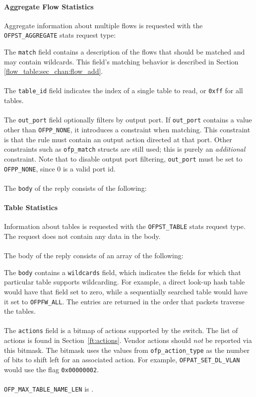 \paragraph{Aggregate Flow Statistics}
Aggregate information about multiple flows is requested with the \verb|OFPST_AGGREGATE| stats request type:


The \verb|match| field contains a description of the flows that should be matched and may contain wildcards.  This field's matching behavior is described in Section \ref{flow_table:sec_chan:flow_add}.
\\\\
The \verb|table_id| field indicates the index of a single table to read, or \verb|0xff| for all tables.
\\\\
The \verb|out_port| field optionally filters by output port.  If \verb|out_port| contains a value other than \verb|OFPP_NONE|, it introduces a constraint when matching.  This constraint is that the rule must contain an output action directed at that port.  Other constraints such as \verb|ofp_match| structs are still used; this is purely an \emph{additional} constraint.  Note that to disable output port filtering, \verb|out_port| must be set to \verb|OFPP_NONE|, since 0 is a valid port id. 
\\\\
The \verb|body| of the reply consists of the following:

 

\paragraph{Table Statistics}
Information about tables is requested with the \verb|OFPST_TABLE| stats request type.  The request does not contain any data in the body.
\\\\
The body of the reply consists of an array of the following:


The \verb|body| contains a \verb|wildcards| field, which indicates the fields for which that particular table supports wildcarding. For example, a direct look-up hash table would have that field set to zero, while a sequentially searched table would have it set to \verb|OFPFW_ALL|. The entries are returned in the order that packets traverse the tables. 
\\\\
The \verb|actions| field is a bitmap of actions supported by the switch.  The list of actions is found in Section~\ref{ft:actions}. Vendor actions should \emph{not} be reported via this bitmask. The bitmask uses the values from \verb|ofp_action_type| as the number of bits to shift left for an associated action. For example, \verb|OFPAT_SET_DL_VLAN| would use the flag \verb|0x00000002|.
\\\\
\verb|OFP_MAX_TABLE_NAME_LEN| is .

